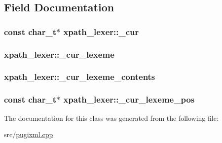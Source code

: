 \subsection{Field Documentation}
\hypertarget{classxpath__lexer_af1c8627ba8f2522ce4bd81dce1899f52}{
\subsubsection[{\_\-cur}]{\setlength{\rightskip}{0pt plus 5cm}const char\_\-t$\ast$ {\bf xpath\_\-lexer::\_\-cur}}}
\label{classxpath__lexer_af1c8627ba8f2522ce4bd81dce1899f52}
\hypertarget{classxpath__lexer_a29b63ce861f781e1aa00763ad1dcb6cf}{
\subsubsection[{\_\-cur\_\-lexeme}]{ {\bf xpath\_\-lexer::\_\-cur\_\-lexeme}}}
\label{classxpath__lexer_a29b63ce861f781e1aa00763ad1dcb6cf}
\hypertarget{classxpath__lexer_a7fa3402e23b860db2386b00995e69d20}{
\subsubsection[{\_\-cur\_\-lexeme\_\-contents}]{ {\bf xpath\_\-lexer::\_\-cur\_\-lexeme\_\-contents}}}
\label{classxpath__lexer_a7fa3402e23b860db2386b00995e69d20}
\hypertarget{classxpath__lexer_a01e5586ea5b1bfa456cd5318bad9f793}{
\subsubsection[{\_\-cur\_\-lexeme\_\-pos}]{\setlength{\rightskip}{0pt plus 5cm}const char\_\-t$\ast$ {\bf xpath\_\-lexer::\_\-cur\_\-lexeme\_\-pos}}}
\label{classxpath__lexer_a01e5586ea5b1bfa456cd5318bad9f793}


The documentation for this class was generated from the following file:\begin{DoxyCompactItemize}
\item 
src/\hyperlink{pugixml_8cpp}{pugixml.cpp}\end{DoxyCompactItemize}
